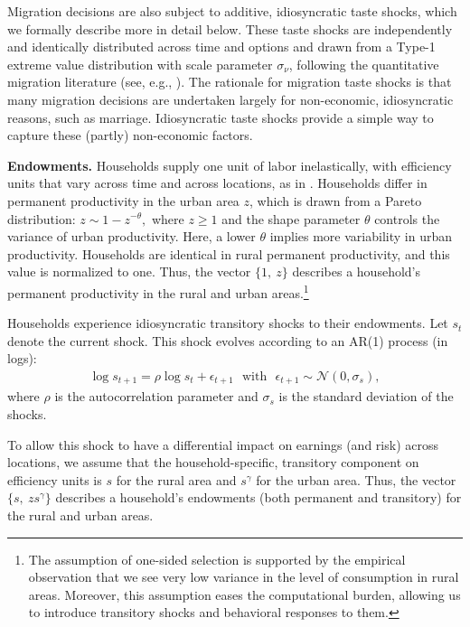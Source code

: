 \documentclass[12pt,pdftex]{article}
\begin{document}
Migration decisions are also subject to additive, idiosyncratic taste shocks, which we formally describe more in detail below. These taste shocks are independently and identically distributed across time and options and drawn from a Type-1 extreme value distribution with scale parameter $\sigma_{\nu}$, following the quantitative migration literature (see, e.g., \citet{cadv19}). The rationale for migration taste shocks is that many migration decisions are undertaken largely for non-economic, idiosyncratic reasons, such as marriage. Idiosyncratic taste shocks provide a simple way to capture these (partly) non-economic factors.

\textbf{Endowments.} Households supply one unit of labor inelastically, with efficiency units that vary across time and across locations, as in \citet{roy51}. Households differ in permanent productivity in the urban area $z$, which is drawn from a Pareto distribution: $z \sim 1 - z^{-\theta},$ where $z \ge 1$ and the shape parameter $\theta$ controls the variance of urban productivity. Here, a lower $\theta$ implies more variability in urban productivity. Households are identical in rural permanent productivity, and this value is normalized to one. Thus, the vector $\{1, \ z\}$ describes a household's permanent productivity in the rural and urban areas.\footnote{The assumption of one-sided selection is supported by the empirical observation that we see very low variance in the level of consumption in rural areas. Moreover, this assumption eases the computational burden, allowing us to introduce transitory shocks and behavioral responses to them.}

Households experience idiosyncratic transitory shocks to their endowments. Let $s_t$ denote the current shock. This shock evolves according to an AR(1) process (in logs):
\begin{align*}
\log s_{t+1} = \rho \log s_{t} + \epsilon_{t+1} \ \ \  \mbox{with} \ \  \ \epsilon_{t+1} \sim \mathcal{N}(0,\sigma_{s}),
\end{align*}
where $\rho$ is the autocorrelation parameter and $\sigma_s$ is the standard deviation of the shocks.

To allow this shock to have a differential impact on earnings (and risk) across locations, we assume that the household-specific, transitory component on efficiency units is $s$ for the rural area and $s^\gamma$ for the urban area. Thus, the vector $\{s, \ z s^\gamma \}$ describes a household's endowments (both permanent and transitory) for the rural and urban areas.
\end{document}
